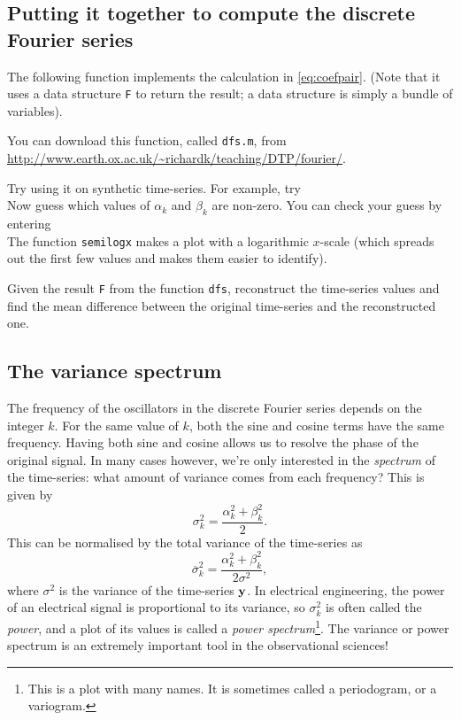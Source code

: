 \documentclass[11pt,twoside,a4paper]{article}
\begin{document}
\subsection{Putting it together to compute the discrete Fourier series}

The following \Mlab function implements the calculation in
\autoref{eq:coefpair}.  (Note that it uses a data structure \texttt{F}
to return the result; a data structure is simply a bundle of
variables).



You can download this function, called \texttt{dfs.m}, from 
\url{http://www.earth.ox.ac.uk/~richardk/teaching/DTP/fourier/}.

Try using it on synthetic time-series.  For example, try
\\
Now guess which values of $\alpha_k$ and $\beta_k$ are non-zero. You
can check your guess by entering
\\
The function \texttt{semilogx} makes a plot with a logarithmic
$x$-scale (which spreads out the first few values and makes
them easier to identify). 

\question Given the result \texttt{F} from the function \texttt{dfs},
reconstruct the time-series values and find the mean difference
between the original time-series and the reconstructed one.

\subsection{The variance spectrum}

The frequency of the oscillators in the discrete Fourier series
depends on the integer $k$. For the same value of $k$, both the sine
and cosine terms have the same frequency.  Having both sine and cosine
allows us to resolve the phase of the original signal.  In many cases
however, we're only interested in the \textit{spectrum} of the
time-series: what amount of variance comes from each frequency? This
is given by
\begin{displaymath}
  \sigma_k^2 = \frac{\alpha_k^2+\beta_k^2}{2}.
\end{displaymath}
This can be normalised by the total variance of the time-series as 
\begin{equation}
  \label{eq:varnormed}
  \overline{\sigma}_k^2 = \frac{\alpha_k^2+\beta_k^2}{2\sigma^2},
\end{equation}
where $\sigma^2$ is the variance of the time-series $\mbox{{\bf y}}$.  In
electrical engineering, the power of an electrical signal is
proportional to its variance, so $\sigma_k^2$ is often called the
\textit{power}, and a plot of its values is called a \textit{power
  spectrum}\footnote{This is a plot with many names.  It is sometimes
  called a periodogram, or a variogram.}.  The variance or power
spectrum is an extremely important tool in the observational sciences!
\end{document}
